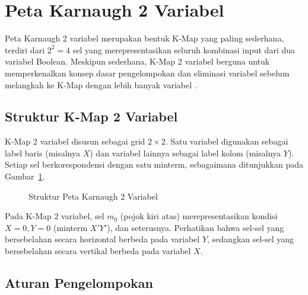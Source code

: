 \section{Peta Karnaugh 2 Variabel}

Peta Karnaugh 2 variabel merupakan bentuk K-Map yang paling sederhana, terdiri dari $2^2 = 4$ sel yang merepresentasikan seluruh kombinasi input dari dua variabel Boolean. Meskipun sederhana, K-Map 2 variabel berguna untuk memperkenalkan konsep dasar pengelompokan dan eliminasi variabel sebelum melangkah ke K-Map dengan lebih banyak variabel \cite{rosen2019}.

\subsection{Struktur K-Map 2 Variabel}

K-Map 2 variabel disusun sebagai grid $2 \times 2$. Satu variabel digunakan sebagai label baris (misalnya $X$) dan variabel lainnya sebagai label kolom (misalnya $Y$). Setiap sel berkorespondensi dengan satu minterm, sebagaimana ditunjukkan pada Gambar~\ref{fig:kmap-2var}.

\begin{figure}[H]
\centering
{}
\caption{Struktur Peta Karnaugh 2 Variabel}
\label{fig:kmap-2var}
\end{figure}

Pada K-Map 2 variabel, sel $m_0$ (pojok kiri atas) merepresentasikan kondisi $X = 0, Y = 0$ (minterm $X'Y'$), dan seterusnya. Perhatikan bahwa sel-sel yang bersebelahan secara horizontal berbeda pada variabel $Y$, sedangkan sel-sel yang bersebelahan secara vertikal berbeda pada variabel $X$.

\subsection{Aturan Pengelompokan}

